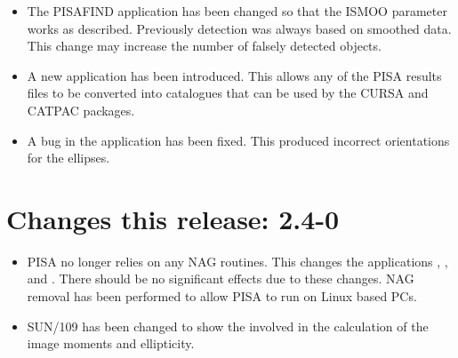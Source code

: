 \begin{itemize}
  \item The PISAFIND application has been changed so that the ISMOO
        parameter works as described. Previously detection was always
        based on smoothed data. This change may increase the number of
        falsely detected objects.
  \item A new application  has been introduced. This
        allows any of the PISA results files to be converted into
        catalogues that can be used by the CURSA and CATPAC packages.
  \item A bug in the  application has been fixed. This
        produced incorrect orientations for the ellipses.
\end{itemize}

\section{Changes this release: 2.4-0}

\begin{itemize}
   \item PISA no longer relies on any NAG routines. This changes the 
    applications , ,  and 
    . There should be no significant effects due to
    these changes. NAG removal has been performed to allow PISA to run
    on Linux based PCs.

    \item SUN/109 has been changed to show the
      involved in the calculation of the 
     image moments and ellipticity.
\end{itemize}


